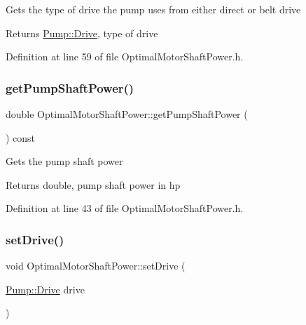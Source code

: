 Gets the type of drive the pump uses from either direct or belt drive \begin{DoxyReturn}{Returns}
\hyperlink{class_pump_a32bf0ade131a11bb3b3fb374f638e983}{Pump\+::\+Drive}, type of drive 
\end{DoxyReturn}


Definition at line 59 of file Optimal\+Motor\+Shaft\+Power.\+h.

\mbox{\label{class_optimal_motor_shaft_power_aca7bb632c659ecf2ebf3cb9fdb23626f}} 
\subsubsection{\texorpdfstring{get\+Pump\+Shaft\+Power()}{getPumpShaftPower()}}
{\footnotesize\ttfamily double Optimal\+Motor\+Shaft\+Power\+::get\+Pump\+Shaft\+Power (\begin{DoxyParamCaption}{ }\end{DoxyParamCaption}) const\hspace{0.3cm}{\ttfamily [inline]}}

Gets the pump shaft power \begin{DoxyReturn}{Returns}
double, pump shaft power in hp 
\end{DoxyReturn}


Definition at line 43 of file Optimal\+Motor\+Shaft\+Power.\+h.

\mbox{\label{class_optimal_motor_shaft_power_abd88cbdcba70dbb194a8f957b4467fc7}} 
\subsubsection{\texorpdfstring{set\+Drive()}{setDrive()}}
{\footnotesize\ttfamily void Optimal\+Motor\+Shaft\+Power\+::set\+Drive (\begin{DoxyParamCaption}\item[{\hyperlink{class_pump_a32bf0ade131a11bb3b3fb374f638e983}{Pump\+::\+Drive}}]{drive }\end{DoxyParamCaption})\hspace{0.3cm}{\ttfamily [inline]}}

